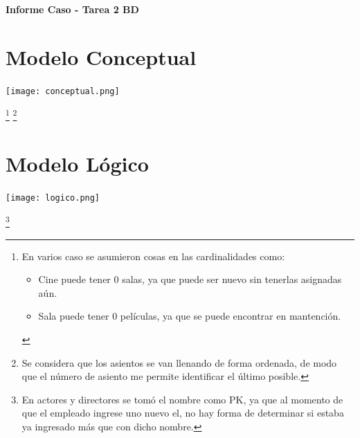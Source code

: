 \documentclass[11pt,letterpaper]{article}
\newcommand{\titulo}{Informe Caso - Tarea 2 BD}
\renewcommand{\maketitle}
{
\thispagestyle{fancy}
\begin{center}
\begin{Large}
\textbf{\titulo}\\
\end{Large}
\end{center}
\vspace{0.3cm}
}
\begin{document}
\maketitle
\section{Modelo Conceptual}
\vspace{0.6cm}
\begin{center}
	\texttt{[image: conceptual.png]}
\end{center}
\let\thefootnote\relax\footnote{En varios caso se asumieron cosas en las cardinalidades como:
	\begin{itemize}
		\item Cine puede tener 0 salas, ya que puede ser nuevo sin tenerlas asignadas aún.
		\item Sala puede tener 0 películas, ya que se puede encontrar en mantención.
	\end{itemize}
}
\footnote{Se considera que los asientos se van llenando de forma ordenada, de modo que el número de asiento me permite identificar el último posible.}

\newpage
\section{Modelo Lógico}
\vspace{0.6cm}
\begin{center}
	\texttt{[image: logico.png]}
\end{center}
\footnote{En actores y directores se tomó el nombre como PK, ya que al momento de que el empleado ingrese uno nuevo el, no hay forma de determinar si estaba ya ingresado más que con dicho nombre.}
\end{document}
